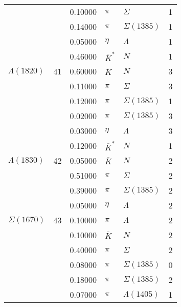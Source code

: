 \documentclass[a4paper,10pt]{article}
\begin{document}
\begin{tabular}[t]{|lr|l|ll|l|}
$                    $&   & 0.10000&$ \pi                 $ &$ \Sigma              $& 1\\
$                    $&   & 0.14000&$ \pi                 $ &$ \Sigma(1385)        $& 1\\
$                    $&   & 0.05000&$ \eta                $ &$ \Lambda             $& 1\\
$                    $&   & 0.46000&$ \overline{K}^*      $ &$ N                   $& 1\\
\hline
$      \Lambda(1820) $& 41& 0.60000&$ \overline{K}        $ &$ N                   $& 3\\
$                    $&   & 0.11000&$ \pi                 $ &$ \Sigma              $& 3\\
$                    $&   & 0.12000&$ \pi                 $ &$ \Sigma(1385)        $& 1\\
$                    $&   & 0.02000&$ \pi                 $ &$ \Sigma(1385)        $& 3\\
$                    $&   & 0.03000&$ \eta                $ &$ \Lambda             $& 3\\
$                    $&   & 0.12000&$ \overline{K}^*      $ &$ N                   $& 1\\
\hline
$      \Lambda(1830) $& 42& 0.05000&$ \overline{K}        $ &$ N                   $& 2\\
$                    $&   & 0.51000&$ \pi                 $ &$ \Sigma              $& 2\\
$                    $&   & 0.39000&$ \pi                 $ &$ \Sigma(1385)        $& 2\\
$                    $&   & 0.05000&$ \eta                $ &$ \Lambda             $& 2\\
\hline
$      \Sigma(1670)  $& 43& 0.10000&$ \pi                 $ &$ \Lambda             $& 2\\
$                    $&   & 0.10000&$ \overline{K}        $ &$ N                   $& 2\\
$                    $&   & 0.40000&$ \pi                 $ &$ \Sigma              $& 2\\
$                    $&   & 0.08000&$ \pi                 $ &$ \Sigma(1385)        $& 0\\
$                    $&   & 0.18000&$ \pi                 $ &$ \Sigma(1385)        $& 2\\
$                    $&   & 0.07000&$ \pi                 $ &$ \Lambda(1405)       $& 1\\

\end{tabular}
\end{document}
